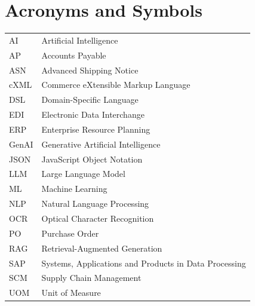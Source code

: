 \chapter*{Acronyms and Symbols}

\begin{tabular}{@{}ll@{}}
AI    & Artificial Intelligence \\
AP    & Accounts Payable \\
ASN   & Advanced Shipping Notice \\
cXML  & Commerce eXtensible Markup Language \\
DSL   & Domain-Specific Language \\
EDI   & Electronic Data Interchange \\
ERP   & Enterprise Resource Planning \\
GenAI & Generative Artificial Intelligence \\
JSON  & JavaScript Object Notation \\
LLM   & Large Language Model \\
ML    & Machine Learning \\
NLP   & Natural Language Processing \\
OCR   & Optical Character Recognition \\
PO    & Purchase Order \\
RAG   & Retrieval-Augmented Generation \\
SAP   & Systems, Applications and Products in Data Processing \\
SCM   & Supply Chain Management \\
UOM   & Unit of Measure \\
\end{tabular}
